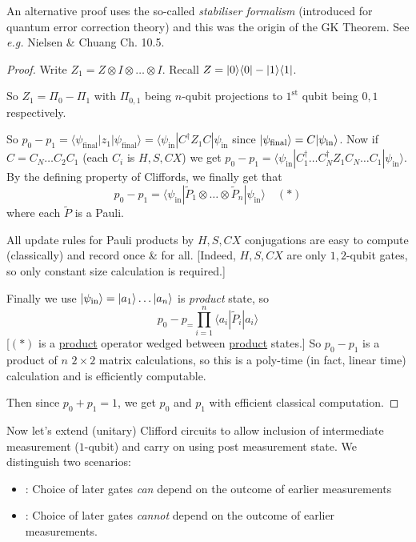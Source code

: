 \documentclass[]{article}
\renewcommand{\it}[1]{\textit{#1}}
\begin{document}
\begin{remark*}
	An alternative proof uses the so-called \it{stabiliser formalism} (introduced for quantum error correction theory) and this was the origin of the GK Theorem. See \it{e.g.} Nielsen \& Chuang Ch. 10.5.
\end{remark*}
\begin{proof}
	Write $Z_1 = Z\otimes I \otimes \dots \otimes I$. Recall $Z = \lvert0\rangle\langle0\rvert - \lvert1\rangle\langle1\rvert$.

	So $Z_1 = \Pi_0 - \Pi_1$ with $\Pi_{0,1}$ being $n$-qubit projections to $1^{\textrm{st}}$ qubit being $0,1$ respectively.

	So $p_0 - p_1 = \langle \psi_{\textrm{final}}|z_1|\psi_{\textrm{final}}\rangle = \langle \psi_{\textrm{in}}|C^\dagger Z_1C|\psi_{\textrm{in}}$ since $\lvert\psi_{\textrm{final}}\rangle = C\lvert\psi_{\textrm{in}}\rangle$. Now if $C = C_N\dots C_2C_1$ (each $C_i$ is $H,S,CX$) we get $p_0 - p_1 = \langle \psi_{\textrm{in}}|C_1^\dagger \dots C_N^\dagger Z_1 C_N\dots C_1 | \psi_{\textrm{in}}\rangle$. By the defining property of Cliffords, we finally get that $$p_0 - p_1 = \langle \psi_{\textrm{in}}|\tilde{P}_1\otimes\dots\otimes\tilde{P}_n|\psi_{\textrm{in}}\rangle\quad (\ast)$$ where each $\tilde{P}$ is a Pauli.

	All update rules for Pauli products by $H,S,CX$ conjugations are easy to compute (classically) and record once \& for all. [Indeed, $H,S,CX$ are only $1,2$-qubit gates, so only constant size calculation is required.]

	Finally we use $\lvert\psi_{\textrm{in}}\rangle = \lvert a_1\rangle\dots\lvert a_n\rangle$ is \it{product} state, so $$p_0 - p_ = \prod_{i=1}^{n}\langle a_i | \tilde{P}_i | a_i\rangle$$ [$(\ast)$ is a \underline{product} operator wedged between \underline{product} states.] So $p_0 - p_1$ is a product of $n$ $2\times 2$ matrix calculations, so this is a poly-time (in fact, linear time) calculation and is efficiently computable.

	Then since $p_0 + p_1 = 1$, we get $p_0$ and $p_1$ with efficient classical computation.
\end{proof}

Now let's extend (unitary) Clifford circuits to allow inclusion of intermediate measurement ($1$-qubit) and carry on using post measurement state. We distinguish two scenarios:

\begin{itemize}
	\item {}: Choice of later gates \it{can} depend on the outcome of earlier measurements
	\item {}: Choice of later gates \it{cannot} depend on the outcome of earlier measurements.
\end{itemize}
\end{document}
